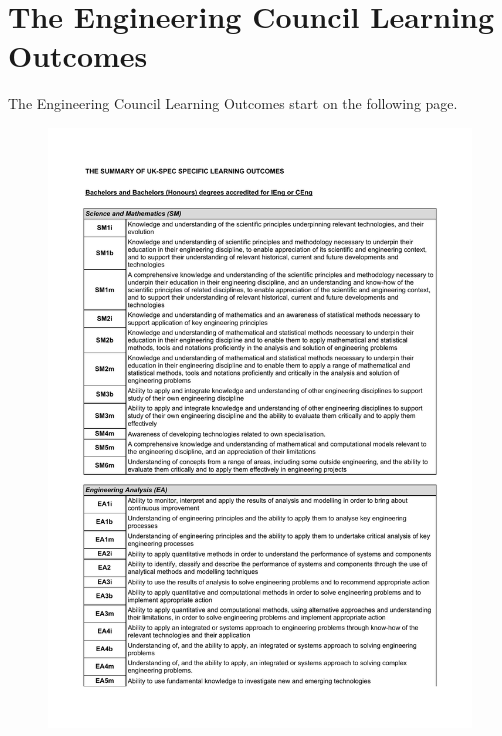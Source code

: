 
\chapter{The Engineering Council Learning Outcomes} %

\label{App:ECLOs} %


The Engineering Council Learning Outcomes 
start on the following page.


\newpage
\begin{figure}
	\centering
	\includegraphics[height=\textheight]{Appendices/ECLO1.pdf}
\end{figure}



